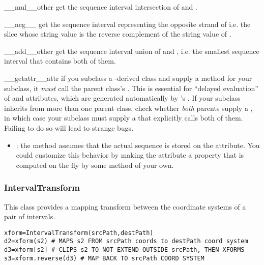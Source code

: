 \documentclass{howto}
\begin{document}
\begin{funcdesc}{__mul__}{other}
  get the sequence interval intersection of  and .
\end{funcdesc}

\begin{funcdesc}{__neg__}{}
  get the sequence interval representing the opposite strand of  
  i.e. the slice whose string value is the reverse complement of the string
  value of .
\end{funcdesc}

\begin{funcdesc}{__add__}{other}
  get the sequence interval union of  and , i.e.
  the smallest sequence interval that contains both of them.
\end{funcdesc}


\begin{funcdesc}{__getattr__}{attr}
  if you subclass a -derived class and supply a 
  method for your subclass, it {\em must} call the parent class's 
  .  This is essential for ``delayed evaluation'' of
   and  attributes, which are generated automatically
  by 's .  If your subclass inherits from
  more than one parent class, check whether {\em both} parents supply a 
  , in which case your subclass must supply a
   that explicitly calls both of them.  Failing to do so
  will lead to strange bugs.
\end{funcdesc}

\begin{itemize}
\item
{}: the  method assumes that 
the actual sequence is stored
on the  attribute.  You could customize this behavior by 
making the  attribute a property that is computed on the fly
by some method of your own.

\end{itemize}


\subsubsection{IntervalTransform}
This class provides a mapping transform between the coordinate
systems of a pair of intervals.

\begin{verbatim}
xform=IntervalTransform(srcPath,destPath)
d2=xform(s2) # MAPS s2 FROM srcPath coords to destPath coord system
d3=xform[s2] # CLIPS s2 TO NOT EXTEND OUTSIDE srcPath, THEN XFORMS
s3=xform.reverse(d3) # MAP BACK TO srcPath COORD SYSTEM
\end{verbatim}
\end{document}
